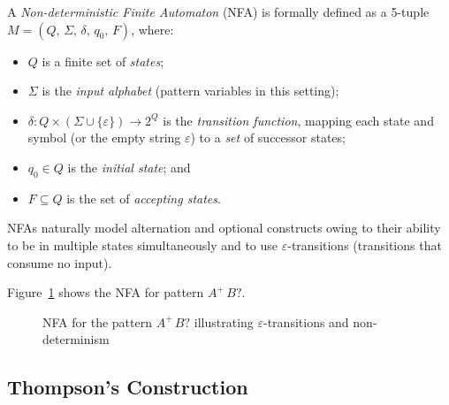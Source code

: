 A \emph{Non-deterministic Finite Automaton} (NFA) is formally
defined as a 5-tuple $M = (Q,\,\Sigma,\,\delta,\,q_0,\,F)$, where:

\begin{itemize}
  \item $Q$ is a finite set of \emph{states};
  \item $\Sigma$ is the \emph{input alphabet} (pattern variables in
    this setting);
  \item $\delta : Q \times (\Sigma \cup \{\varepsilon\}) \to 2^{Q}$
    is the \emph{transition function}, mapping each state and symbol
    (or the empty string $\varepsilon$) to a \emph{set} of successor
    states;
  \item $q_0 \in Q$ is the \emph{initial state}; and
  \item $F \subseteq Q$ is the set of \emph{accepting states}.
\end{itemize}

NFAs naturally model alternation and optional constructs owing to
their ability to be in multiple states simultaneously and to use
$\varepsilon$-transitions (transitions that consume no input).

Figure~\ref{fig:meth-nfa} shows the NFA for pattern $A^{+}\,B?$.

\begin{figure}[htbp]
  \centering
  \caption{NFA for the pattern $A^{+}\,B?$ illustrating
    $\varepsilon$-transitions and non-determinism}
  \label{fig:meth-nfa}
\end{figure}

\subsection{Thompson's Construction}
\label{subsec:meth-thompson}

